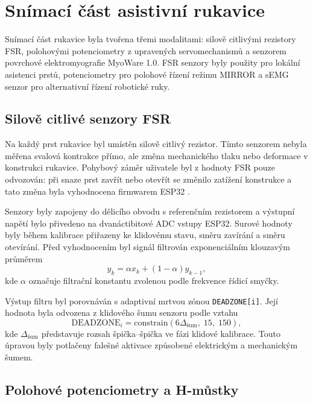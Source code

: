 \section{Snímací část asistivní rukavice}
\label{sec:snimaci-cast-rukavice}

Snímací část rukavice byla tvořena třemi modalitami: silově citlivými rezistory FSR, polohovými potenciometry z upravených servomechanismů a senzorem povrchové elektromyografie MyoWare 1.0. FSR senzory byly použity pro lokální asistenci prstů, potenciometry pro polohové řízení režimu MIRROR a sEMG senzor pro alternativní řízení robotické ruky.

\subsection{Silově citlivé senzory FSR}
\label{subsec:fsr}

Na každý prst rukavice byl umístěn silově citlivý rezistor. Tímto senzorem nebyla měřena svalová kontrakce přímo, ale změna mechanického tlaku nebo deformace v konstrukci rukavice. Pohybový záměr uživatele byl z hodnoty FSR pouze odvozován: při snaze prst zavřít nebo otevřít se změnilo zatížení konstrukce a tato změna byla vyhodnocena firmwarem ESP32 \cite{Trajlinek2021,GIUDICI2025}.

Senzory byly zapojeny do dělicího obvodu s referenčním rezistorem a výstupní napětí bylo přivedeno na dvanáctibitové ADC vstupy ESP32. Surové hodnoty byly během kalibrace přiřazeny ke klidovému stavu, směru zavírání a směru otevírání. Před vyhodnocením byl signál filtrován exponenciálním klouzavým průměrem
\begin{equation}
    y_k = \alpha x_k + \left(1 - \alpha\right)y_{k-1},
\end{equation}
kde $\alpha$ označuje filtrační konstantu zvolenou podle frekvence řídicí smyčky.

Výstup filtru byl porovnáván s adaptivní mrtvou zónou \texttt{DEADZONE[i]}. Její hodnota byla odvozena z klidového šumu senzoru podle vztahu
\begin{equation}
    \mathrm{DEADZONE}_i =
    \mathrm{constrain}\left(6\Delta_{\mathrm{šum}},\;15,\;150\right),
\end{equation}
kde $\Delta_{\mathrm{šum}}$ představuje rozsah špička--špička ve fázi klidové kalibrace. Touto úpravou byly potlačeny falešné aktivace způsobené elektrickým a mechanickým šumem.

\subsection{Polohové potenciometry a H-můstky}
\label{subsec:potenciometry-hmustky}

